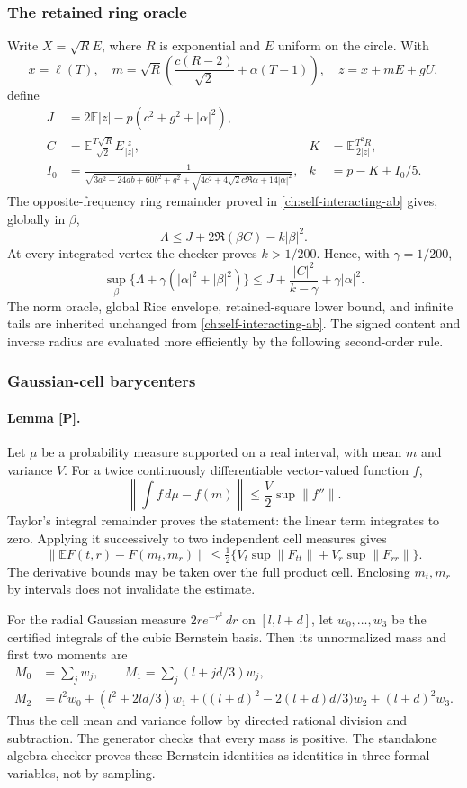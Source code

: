 \subsubsection{The retained ring oracle}
Write $X=\sqrt R E$, where $R$ is exponential and $E$ uniform on the circle. With
\[
 x=\ell(T),\quad
 m=\sqrt R\left(\frac{c(R-2)}{\sqrt2}+\alpha(T-1)\right),
 \quad z=x+mE+gU,
\]
define
\begin{align*}
 J&=2\mathbb E|z|-p(c^2+g^2+|\alpha|^2),\\
 C&=\mathbb E\frac{T\sqrt R}{\sqrt2}\overline E\frac{\overline z}{|z|},
 &K&=\mathbb E\frac{T^2R}{2|z|},\\
 I_0&=\frac1{\sqrt{3a^2+24ab+60b^2+g^2}
       +\sqrt{4c^2+4\sqrt2c\Re\alpha+14|\alpha|^2}},
 &k&=p-K+I_0/5.
\end{align*}
The opposite-frequency ring remainder proved in \autoref{ch:self-interacting-ab} gives, globally in $\beta$,
\[
 \Lambda\le J+2\Re(\beta C)-k|\beta|^2.
\]
At every integrated vertex the checker proves $k>1/200$. Hence, with $\gamma=1/200$,
\[
 \sup_\beta\{\Lambda+\gamma(|\alpha|^2+|\beta|^2)\}
 \le J+\frac{|C|^2}{k-\gamma}+\gamma|\alpha|^2.
\]
The norm oracle, global Rice envelope, retained-square lower bound, and infinite tails are inherited unchanged from \autoref{ch:self-interacting-ab}. The signed content and inverse radius are evaluated more efficiently by the following second-order rule.

\subsubsection{Gaussian-cell barycenters}
\paragraph{Lemma [P].}
Let $\mu$ be a probability measure supported on a real interval, with mean $m$ and variance $V$. For a twice continuously differentiable vector-valued function $f$,
\[
 \left\|\int f\,d\mu-f(m)\right\|
 \le\frac V2\sup\|f''\|.
\]
Taylor's integral remainder proves the statement: the linear term integrates to zero. Applying it successively to two independent cell measures gives
\[
 \|\mathbb EF(t,r)-F(m_t,m_r)\|
 \le\tfrac12\{V_t\sup\|F_{tt}\|+V_r\sup\|F_{rr}\|\}.
\]
The derivative bounds may be taken over the full product cell. Enclosing $m_t,m_r$ by intervals does not invalidate the estimate.

For the radial Gaussian measure $2r e^{-r^2}\,dr$ on $[l,l+d]$, let $w_0,\ldots,w_3$ be the certified integrals of the cubic Bernstein basis. Then its unnormalized mass and first two moments are
\begin{align*}
 M_0&=\sum_jw_j,\qquad
 M_1=\sum_j(l+jd/3)w_j,\\
 M_2&=l^2w_0+(l^2+2ld/3)w_1
 +\bigl((l+d)^2-2(l+d)d/3\bigr)w_2+(l+d)^2w_3.
\end{align*}
Thus the cell mean and variance follow by directed rational division and subtraction. The generator checks that every mass is positive. The standalone algebra checker proves these Bernstein identities as identities in three formal variables, not by sampling.

